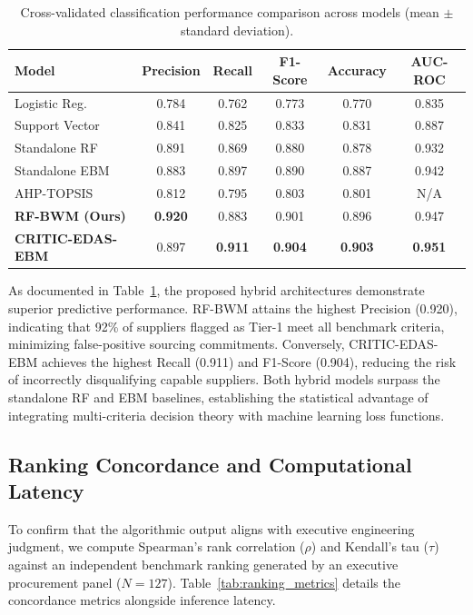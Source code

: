 \documentclass[twocolumn,10pt]{article}
\begin{document}
\begin{table}[h]
\centering
\caption{Cross-validated classification performance comparison across models (mean $\pm$ standard deviation).}
\label{tab:classification_benchmarks}
\footnotesize
\begin{tabular}{lccccc}
\toprule
\textbf{Model} & \textbf{Precision} & \textbf{Recall} & \textbf{F1-Score} & \textbf{Accuracy} & \textbf{AUC-ROC} \\
\midrule
Logistic Reg. & 0.784 & 0.762 & 0.773 & 0.770 & 0.835 \\
Support Vector & 0.841 & 0.825 & 0.833 & 0.831 & 0.887 \\
Standalone RF & 0.891 & 0.869 & 0.880 & 0.878 & 0.932 \\
Standalone EBM & 0.883 & 0.897 & 0.890 & 0.887 & 0.942 \\
AHP-TOPSIS & 0.812 & 0.795 & 0.803 & 0.801 & N/A \\
\midrule
\textbf{RF-BWM (Ours)} & \textbf{0.920} & 0.883 & 0.901 & 0.896 & 0.947 \\
\textbf{CRITIC-EDAS-EBM} & 0.897 & \textbf{0.911} & \textbf{0.904} & \textbf{0.903} & \textbf{0.951} \\
\bottomrule
\end{tabular}
\end{table}

As documented in Table~\ref{tab:classification_benchmarks}, the proposed hybrid architectures demonstrate superior predictive performance. RF-BWM attains the highest Precision (0.920), indicating that 92\% of suppliers flagged as Tier-1 meet all benchmark criteria, minimizing false-positive sourcing commitments. Conversely, CRITIC-EDAS-EBM achieves the highest Recall (0.911) and F1-Score (0.904), reducing the risk of incorrectly disqualifying capable suppliers. Both hybrid models surpass the standalone RF and EBM baselines, establishing the statistical advantage of integrating multi-criteria decision theory with machine learning loss functions.

\subsection{Ranking Concordance and Computational Latency}
To confirm that the algorithmic output aligns with executive engineering judgment, we compute Spearman's rank correlation ($\rho$) and Kendall's tau ($\tau$) against an independent benchmark ranking generated by an executive procurement panel ($N=127$). Table~\ref{tab:ranking_metrics} details the concordance metrics alongside inference latency.
\end{document}
